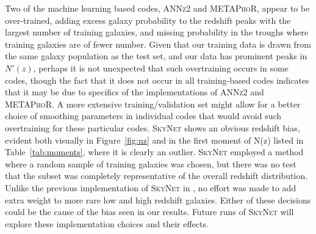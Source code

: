 Two of the machine learning based codes, \textsc{ANNz2} and \textsc{METAPhoR}, appear to be over-trained, adding excess galaxy probability to the redshift peaks with the largest number of training galaxies, and missing probability in the troughs where training galaxies are of fewer number.
Given that our training data is drawn from the same galaxy population as the test set, and our data has prominent peaks in $N'(z)$, perhaps it is not unexpected that such overtraining occurs in some codes, though the fact that it does not occur in all training-based codes indicates that it may be due to specifics of the implementations of \textsc{ANNz2} and \textsc{METAPhoR}.
A more extensive training/validation set might allow for a better choice of smoothing parameters in individual codes that would avoid such overtraining for these particular codes.
\textsc{SkyNet} shows an obvious redshift bias, evident both visually in Figure~\ref{fig:nz} and in the first moment of N(z) listed in Table~\ref{tab:moments}, where it is clearly an outlier.  \textsc{SkyNet} employed a method where a random sample of training galaxies was chosen, but there was no test that the subset was completely representative of the overall redshift distribution.  Unlike the previous implementation of \textsc{SkyNet} in \citet{Bonnett:15}, no effort was made to add extra weight to more rare low and high redshift galaxies.  Either of these decisions could be the cause of the bias seen in our results.  Future runs of \textsc{SkyNet} will explore these implementation choices and their effects.


